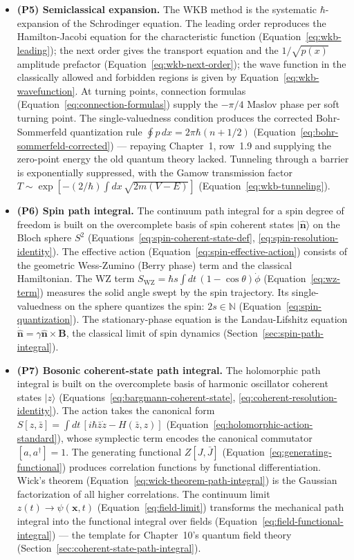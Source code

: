 \begin{itemize}
\item \textbf{(P5) Semiclassical expansion.} The WKB method is the systematic $\hbar$-expansion of the Schrodinger equation. The leading order reproduces the Hamilton-Jacobi equation for the characteristic function (Equation~\eqref{eq:wkb-leading}); the next order gives the transport equation and the $1/\sqrt{p(x)}$ amplitude prefactor (Equation~\eqref{eq:wkb-next-order}); the wave function in the classically allowed and forbidden regions is given by Equation~\eqref{eq:wkb-wavefunction}. At turning points, connection formulas (Equation~\eqref{eq:connection-formulas}) supply the $-\pi/4$ Maslov phase per soft turning point. The single-valuedness condition produces the corrected Bohr-Sommerfeld quantization rule $\oint p\,dx = 2\pi\hbar(n+1/2)$ (Equation~\eqref{eq:bohr-sommerfeld-corrected}) --- repaying Chapter~1, row~1.9 and supplying the zero-point energy the old quantum theory lacked. Tunneling through a barrier is exponentially suppressed, with the Gamow transmission factor $T \sim \exp[-(2/\hbar)\int dx\,\sqrt{2m(V-E)}]$ (Equation~\eqref{eq:wkb-tunneling}).

\item \textbf{(P6) Spin path integral.} The continuum path integral for a spin degree of freedom is built on the overcomplete basis of spin coherent states $|\hat{\bm n}\rangle$ on the Bloch sphere $S^{2}$ (Equations~\eqref{eq:spin-coherent-state-def}, \eqref{eq:spin-resolution-identity}). The effective action (Equation~\eqref{eq:spin-effective-action}) consists of the geometric Wess-Zumino (Berry phase) term and the classical Hamiltonian. The WZ term $S_{\mathrm{WZ}} = \hbar s\int dt\,(1-\cos\theta)\dot{\phi}$ (Equation~\eqref{eq:wz-term}) measures the solid angle swept by the spin trajectory. Its single-valuedness on the sphere quantizes the spin: $2s \in \mathbb{N}$ (Equation~\eqref{eq:spin-quantization}). The stationary-phase equation is the Landau-Lifshitz equation $\dot{\hat{\bm n}} = \gamma\hat{\bm n}\times\bm B$, the classical limit of spin dynamics (Section~\ref{sec:spin-path-integral}).

\item \textbf{(P7) Bosonic coherent-state path integral.} The holomorphic path integral is built on the overcomplete basis of harmonic oscillator coherent states $|z\rangle$ (Equations~\eqref{eq:bargmann-coherent-state}, \eqref{eq:coherent-resolution-identity}). The action takes the canonical form $S[z,\bar z] = \int dt\,[i\hbar\bar z\dot z - H(\bar z,z)]$ (Equation~\eqref{eq:holomorphic-action-standard}), whose symplectic term encodes the canonical commutator $[a,a^{\dagger}]=1$. The generating functional $Z[J,\bar J]$ (Equation~\eqref{eq:generating-functional}) produces correlation functions by functional differentiation. Wick's theorem (Equation~\eqref{eq:wick-theorem-path-integral}) is the Gaussian factorization of all higher correlations. The continuum limit $z(t) \to \psi(\bm x,t)$ (Equation~\eqref{eq:field-limit}) transforms the mechanical path integral into the functional integral over fields (Equation~\eqref{eq:field-functional-integral}) --- the template for Chapter~10's quantum field theory (Section~\ref{sec:coherent-state-path-integral}).
\end{itemize}

